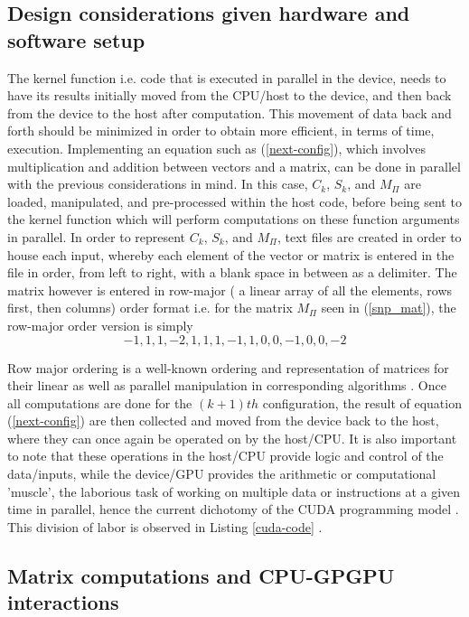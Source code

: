\documentclass{acm_proc_article-sp}
\begin{document}
\subsection{Design considerations given hardware and software
setup}

The kernel function i.e. code that is executed in parallel in
the device, needs to have its results initially moved from the
CPU/host to the device, and then back from the device to the
host after computation. This movement of data back and
forth should be minimized in order to obtain more efficient,
in terms of time, execution.
Implementing an equation such as (\ref{next-config}), which involves
multiplication and addition between vectors and a matrix,
can be done in parallel with the previous considerations in
mind. In this case, $C_k$, $S_k$, and $M_{\Pi}$ are loaded, manipulated, and pre-processed within the host code,
before being sent to the kernel function which will perform
computations on these function arguments in parallel.
In order to represent $C_k$, $S_k$, and $M_{\Pi}$, text files are created in
order to house each input, whereby each element of the
vector or matrix is entered in the file in order, from left to right, with a blank space in between as a delimiter. The
matrix however is entered in row-major ( a linear array of all
the elements, rows first, then columns) order format i.e. for
the matrix $M_{\Pi}$ seen in (\ref{snp_mat}), the row-major order version is simply
\begin{equation}\label{row-maj}
-1, 1, 1, -2, 1, 1, 1, -1, 1, 0, 0, -1, 0, 0, -2
\end{equation}

Row major ordering is a well-known ordering and
representation of matrices for their linear as well as parallel
manipulation in corresponding algorithms \cite{cudabook}. Once all
computations are done for the $(k+1)th$ configuration, the result of
equation (\ref{next-config}) are then collected and moved from the
device back to the host, where they can once again be
operated on by the host/CPU. It is also important to note
that these operations in the host/CPU provide logic and
control of the data/inputs, while the device/GPU provides
the arithmetic or computational 'muscle', the laborious task
of working on multiple data or instructions at a given time in parallel,
hence the current dichotomy of the CUDA programming model \cite{sat}.
This division of labor is observed in Listing \ref{cuda-code} .

\subsection{Matrix
computations
and
CPU-GPGPU
interactions
}
\end{document}
